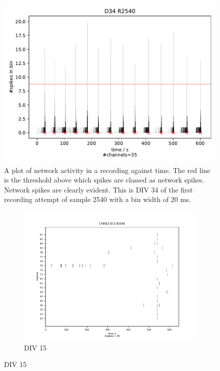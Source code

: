 \documentclass[10pt]{article}
\begin{document}
\begin{figure}[h!]
	\centering
	\includegraphics[width=\textwidth]{../plots/supplementary_figures/network_activity_example.pdf}
	\caption{A plot of network activity in a recording against time. The red line is the threshold above which spikes are classed as network spikes. Network spikes are clearly evident. This is DIV 34 of the first recording attempt of sample 2540 with a bin width of 20 ms.}
	\label{fig:networkact}
\end{figure}

\begin{figure}[h!]
\begin{subfigure}{\textwidth}
	\centering
	\includegraphics[width=\textwidth]{../plots/supplementary_figures/burst_plot_1.pdf}
	\caption{DIV 15}
\end{subfigure}
\end{figure}
\end{document}

